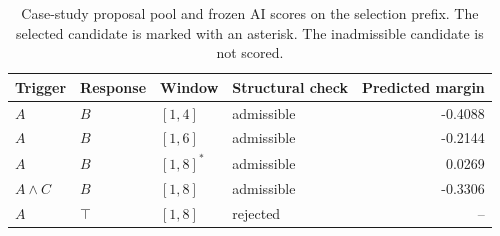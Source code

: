 \begin{table}[t]
\centering
\small

\caption{Case-study proposal pool and frozen AI scores on the selection prefix. The selected candidate is marked with an asterisk. The inadmissible candidate is not scored.}
\label{tab:case-candidates}
\begin{tabular}{@{}llllr@{}}
\toprule
Trigger & Response & Window & Structural check & Predicted margin \\
\midrule
$A$ & $B$ & $[1,4]$ & admissible & -0.4088 \\
$A$ & $B$ & $[1,6]$ & admissible & -0.2144 \\
$A$ & $B$ & $[1,8]^{*}$ & admissible & 0.0269 \\
$A\land C$ & $B$ & $[1,8]$ & admissible & -0.3306 \\
$A$ & $\top$ & $[1,8]$ & rejected & -- \\
\bottomrule
\end{tabular}
\end{table}
